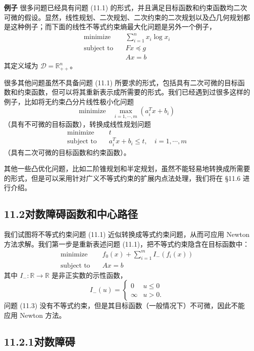 \documentclass[UTF8,12pt,a4paper,fontset=fandol]{ctexart}
\begin{document}
\noindent\textbf{例子}\quad
很多问题已经具有问题 (11.1) 的形式，并且满足目标函数和约束函数均二次可微的假设。显然，线性规划、二次规划、二次约束的二次规划以及凸几何规划都是这种例子；而下面的线性不等式约束熵最大化问题是另外一个例子，
\[
\begin{aligned}
\text{minimize}\quad & \sum_{i=1}^n x_i\log x_i\\
\text{subject to}\quad & Fx\preceq g\\
& Ax=b
\end{aligned}
\]
其定义域为 $\mathcal{D}=\mathbb{R}_{++}^n$。

很多其他问题虽然不具备问题 (11.1) 所要求的形式，包括具有二次可微的目标函数和约束函数，但可以将其重新表示成所需要的形式。我们已经遇到过很多这样的例子，比如将无约束凸分片线性极小化问题
\[
\text{minimize}\quad \max_{i=1,\cdots,m}(a_i^Tx+b_i)
\]
（具有不可微的目标函数），转换成线性规划问题
\[
\begin{aligned}
\text{minimize}\quad & t\\
\text{subject to}\quad & a_i^Tx+b_i\leq t,\quad i=1,\cdots,m
\end{aligned}
\]
（具有二次可微的目标函数和约束函数）。

其他一些凸优化问题，比如二阶锥规划和半定规划，虽然不能轻易地转换成所需要的形式，但是可以采用针对广义不等式约束的扩展内点法处理，我们将在 \S11.6 进行介绍。

\subsection*{11.2\quad 对数障碍函数和中心路径}

我们试图将不等式约束问题 (11.1) 近似转换成等式约束问题，从而可应用 Newton 方法求解。我们第一步是重新表述问题 (11.1)，把不等式约束隐含在目标函数中：
\begin{equation}
\begin{aligned}
\text{minimize}\quad & f_0(x)+\sum_{i=1}^m I_-(f_i(x))\\
\text{subject to}\quad & Ax=b
\end{aligned}
\tag{11.3}
\end{equation}
其中 $I_-:\mathbb{R}\to\mathbb{R}$ 是非正实数的示性函数，
\[
I_-(u)=
\begin{cases}
0 & u\leq 0\\
\infty & u>0.
\end{cases}
\]
问题 (11.3) 没有不等式约束，但是其目标函数（一般情况下）不可微，因此不能应用 Newton 方法。

\subsection*{11.2.1\quad 对数障碍}
\end{document}
